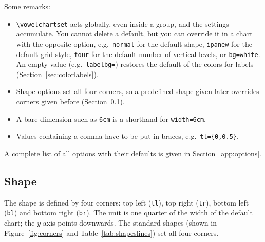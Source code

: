 \documentclass[a4paper,11pt]{article}
\newcommand\cmd[1]{\texttt{\textbackslash #1}}
\newcommand\opt[1]{\texttt{#1}}
\begin{document}
\noindent
Some remarks:

\begin{itemize}
	\item
	\cmd{vowelchartset} acts globally, even inside a group, and the settings accumulate. You cannot delete a default, but you can override it in a chart with the opposite option, e.g.\ \opt{normal} for the default shape, \opt{ipanew} for the default grid style, \opt{four} for the default number of vertical levels, or \opt{bg=white}. An empty value (e.g.\ \opt{labelbg=}) restores the default of the colors for labels (Section~\ref{sec:colorlabels}).
	\item
	Shape options set all four corners, so a predefined shape given later overrides corners given before (Section~\ref{sec:shapes}).
	\item
	A bare dimension such as \opt{6cm} is a shorthand for \opt{width=6cm}.
	\item
	Values containing a comma have to be put in braces, e.g.\ \opt{tl=\{0,0.5\}}.
\end{itemize}

\noindent
A complete list of all options with their defaults is given in Section~\ref{app:options}.




\subsection{Shape} \label{sec:shapes}

The shape is defined by four corners: top left (\opt{tl}), top right
(\opt{tr}), bottom left (\opt{bl}) and bottom right (\opt{br}). The unit is one
quarter of the width of the default chart; the $y$ axis points downwards. The
standard shapes (shown in Figure~\ref{fig:corners} and Table~\ref{tab:shapeslines}) set all four corners.

\newcommand\cornerdemo[8]{%
	\begin{tikzpicture}[x=.4cm, y=.4cm, font=\scriptsize]
		\useasboundingbox (-1.7,1.9) rectangle (5.1,-3.9);
		\foreach \k in {0,...,4}{
			\draw[gray!50, thin] (\k,1) -- (\k,-3.4);
			\node[gray, anchor=south] at (\k,1) {\k};
		}
		\foreach \k in {0,...,3}{
			\draw[gray!50, thin] (-1,-\k) -- (4.8,-\k);
			\node[gray, anchor=east] at (-1,-\k) {\k};
		}
		\draw[gray, -Latex] (-1,1) -- (5.1,1);
		\draw[gray, -Latex] (-1,1) -- (-1,-3.9);
		\draw[thick, blue!60!black, fill=blue!15]
		(#1,-#2) -- (#3,-#4) -- (#7,-#8) -- (#5,-#6) -- cycle;
		\foreach \cx/\cy in {#1/#2, #3/#4, #5/#6, #7/#8}{
			\fill[blue!60!black] (\cx,-\cy) circle (1.5pt);
		}
\end{tikzpicture}}
\end{document}
